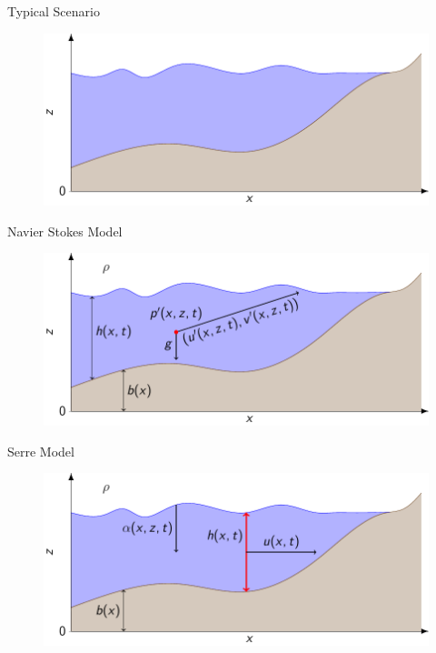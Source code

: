 \documentclass[]{beamer}
\begin{document}
\begin{frame}{Typical Scenario}
	\begin{figure}
		\includegraphics[width=\textwidth]{./Pics/WaterModelDiagrams/FressSurface.pdf}
	\end{figure}
\end{frame}
\begin{frame}{Navier Stokes Model}
	\begin{figure}
		\includegraphics[width=\textwidth]{./Pics/WaterModelDiagrams/NavierStokes.pdf}
	\end{figure}
\end{frame}
\begin{frame}{Serre Model}
	\begin{figure}
		\includegraphics[width=\textwidth]{./Pics/WaterModelDiagrams/Serre.pdf}
	\end{figure}
\end{frame}
\end{document}
